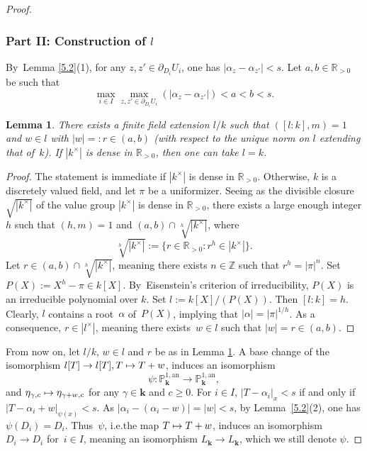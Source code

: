 \documentclass[10pt]{amsart}
\newcommand{\ie}{i.e.}
\newcommand{\mto}{\mathchoice{\longmapsto}{\mapsto}{\mapsto}{\mapsto}}
\newcommand{\bbk}{{\boldsymbol{k}}}%
\newtheorem{lm}[thm]{Lemma}
\theoremstyle{definition}
\begin{document}
\begin{proof}
\subsubsection*{Part II: Construction of $l$}
By~Lemma \ref{5.2}(1), for any $z, z' \in \partial_{D_{i}}{U_{i}}$, one has \hbox{$|\alpha_z-\alpha_{z'}| <s$}.
Let $a,b \in \mathbb{R}_{>0}$ be such that
\[
\max_{i \in I}\max_{z,z' \in \partial_{D_{i}}{U_{i}}}(|\alpha_z-\alpha_{z'}|) <a<b <s.
\]

\begin{lm} \label{extensions}
There exists a finite field extension $l/k$ such that $([l:k], m)=1$ and $ w \in l$ with $|w|=:r \in (a,b)$ (with respect to the unique norm on $l$ extending that of~$k$).
If $|k^{\times}|$ is dense in $\mathbb{R}_{>0}$, then one can take $l=k$.
\end{lm}

\begin{proof}
The statement is immediate if $|k^{\times}|$ is dense in $\mathbb{R}_{>0}$. Otherwise, $k$ is a discretely valued field, and let $\pi$ be a uniformizer. Seeing as the divisible closure $\sqrt{|k^{\times}|}$ of the value group $|k^{\times}|$ is dense in $\mathbb{R}_{>0}$, there exists a large enough integer $h$ such that $(h, m)=1$ and $(a,b) \cap \sqrt[h]{|k^{\times}|}$, where
\[
\sqrt[h]{|k^{\times}|}:=\{r \in \mathbb{R}_{>0}: r^h \in |k^{\times}|\}.
\]
Let $r \in (a,b) \cap \sqrt[h]{|k^{\times}|}$, meaning there exists $n \in \mathbb{Z}$ such that $r^h=|\pi|^n$.
Set $P(X):=X^h-\pi \in k[X]$. By~Eisenstein's criterion of irreducibility, $P(X)$ is an irreducible polynomial over $k$. Set $l\!:=\!k[X]/(P(X))$. Then $[l:k]\!=\!h$. Clearly, $l$ contains a root~$\alpha$ of~$P(X)$, implying that $|\alpha|=|\pi|^{1/h}$. As a consequence, $r \in |l^{\times}|$, meaning there exists~\hbox{$w \in l$} such that $|w|=r \in (a,b)$.
\end{proof}

From now on, let $l/k$, $w \in l$ and $r$ be as in Lemma \ref{extensions}. A base change of the isomorphism $l[T] \to l[T], T \mto T+w$, induces an isomorphism
\[
\psi: \mathbb{P}_{\bbk}^{1, \mathrm{an}} \to \mathbb{P}_{\bbk}^{1, \mathrm{an}},
\]
and $\eta_{\gamma, c} \mto \eta_{\gamma+w, c}$ for any $\gamma \in \bbk$ and $c \geqslant 0$. For $i \in I$, $|T-\alpha_i|_x<{s}$ if and only if $|T-\alpha_i+w|_{\psi(x)}<{s}$. As $|\alpha_i-(\alpha_i-w)|=|w|<s$, by Lemma~\ref{5.2}(2), one has $\psi(D_i)=D_i$. Thus~$\psi$, \ie the map $T \mto T+w$, induces an isomorphism $D_i \to D_i$ for~\hbox{$i \in I$}, meaning an isomorphism $L_{\bbk} \to L_{\bbk}$, which we still denote $\psi$.


\end{proof}
\end{document}
